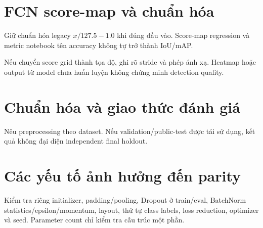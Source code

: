 \section{FCN score-map và chuẩn hóa}
Giữ chuẩn hóa legacy $x/127.5-1.0$ khi đúng đầu vào. Score-map regression và metric notebook tên accuracy không tự trở thành IoU/mAP.

Nếu chuyển score grid thành tọa độ, ghi rõ stride và phép ánh xạ. Heatmap hoặc output từ model chưa huấn luyện không chứng minh detection quality.

\section{Chuẩn hóa và giao thức đánh giá}
Nêu preprocessing theo dataset. Nếu validation/public-test được tái sử dụng, kết quả không đại diện independent final holdout.

\section{Các yếu tố ảnh hưởng đến parity}
Kiểm tra riêng initializer, padding/pooling, Dropout ở train/eval, BatchNorm statistics/epsilon/momentum, layout, thứ tự class labels, loss reduction, optimizer và seed. Parameter count chỉ kiểm tra cấu trúc một phần.